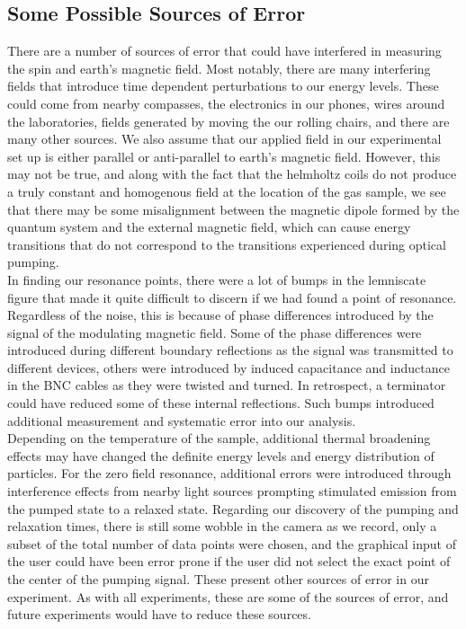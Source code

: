 \documentclass{article}
\begin{document}
    
    \subsection{Some Possible Sources of Error}
    There are a number of sources of error that could have interfered in measuring the spin and earth's magnetic field. Most notably, there are many interfering fields that introduce time dependent perturbations to our energy levels. These could come from nearby compasses, the electronics in our phones, wires around the laboratories, fields generated by moving the our rolling chairs, and there are many other sources. We also assume that our applied field in our experimental set up is either parallel or anti-parallel to earth's magnetic field. However, this may not be true, and along with the fact that the helmholtz coils do not produce a truly constant and homogenous field at the location of the gas sample, we see that there may be some misalignment between the magnetic dipole formed by the quantum system and the external magnetic field, which can cause energy transitions that do not correspond to the transitions experienced during optical pumping.
    \\\indent In finding our resonance points, there were a lot of bumps in the lemniscate figure that made it quite difficult to discern if we had found a point of resonance. Regardless of the noise, this is because of phase differences introduced by the signal of the modulating magnetic field. Some of the phase differences were introduced during different boundary reflections as the signal was transmitted to different devices, others were introduced by induced capacitance and inductance in the BNC cables as they were twisted and turned. In retrospect, a terminator could have reduced some of these internal reflections. Such bumps introduced additional measurement and systematic error into our analysis.
    \\\indent Depending on the temperature of the sample, additional thermal broadening effects may have changed the definite energy levels and energy distribution of particles. For the zero field resonance, additional errors were introduced through interference effects from nearby light sources prompting stimulated emission from the pumped state to a relaxed state. Regarding our discovery of the pumping and relaxation times, there is still some wobble in the camera as we record, only a subset of the total number of data points were chosen, and the graphical input of the user could have been error prone if the user did not select the exact point of the center of the pumping signal. These present other sources of error in our experiment. As with all experiments, these are some of the sources of error, and future experiments would have to reduce these sources.
    
\end{document}
